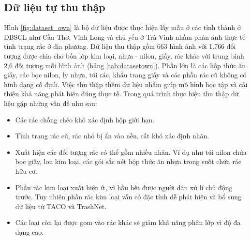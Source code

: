 \documentclass[../the.tex]{subfiles}
\begin{document}
\subsection{Dữ liệu tự thu thập}
\label{sec:own}
{\fontsize{13}{12} \selectfont

	Hình \ref{fig:dataset_own} là bộ dữ liệu được thực hiện lấy mẫu ở các tỉnh thành ở ĐBSCL như Cần Thơ, Vĩnh Long và chủ yếu ở Trà Vinh nhầm phản ánh thực tế tình trạng rác ở địa phương.
	Dữ liệu thu thập gồm 663 hình ảnh với 1.766 đối tượng được chia cho bốn lớp kim loại, nhựa - nilon, giấy, rác khác với trung bình 2,6 đối tượng mỗi hình ảnh (bảng \ref{tab:datasetown}).
	Phần lớn là các hộp thức ăn giấy, các bọc nilon, ly nhựa, túi rác, khẩu trang giấy và các phần rác cũ không có hình dạng cố định.
	Việc thu thập thêm dữ liệu nhầm giúp mô hình học tập và cải thiện khả năng phát hiện đúng thực tế. Trong quá trình thực hiện thu thập dữ liệu gặp những vấn đề như sau:

	\begin{itemize}
		\item Các rác chồng chéo khó xác định hộp giới hạn.
		\item Tình trạng rác cũ, rác nhỏ bị ẩn vào nền, rất khó xác định nhãn.
		\item Xuất hiện các đối tượng rác có thể gồm nhiều nhãn. Ví dụ như túi nilon chứa bọc giấy, lon kim loại, các gói sắc nét hộp thức ăn nhựa trong suốt chứa rác hữu cơ.
		\item Phần rác kim loại xuất hiện ít, vì hầu hết được người dân xử lí chủ động trước. Tuy nhiên phần rác kim loại vẫn có đặc tính dễ phát hiện và bổ sung dữ liệu từ TACO \cite{proença2020taco} và TrashNet.
		\item Các loại còn lại được gom vào rác khác sẽ giảm khả năng phân lớp vì độ đa dạng cao.
	\end{itemize}

}
\end{document}
